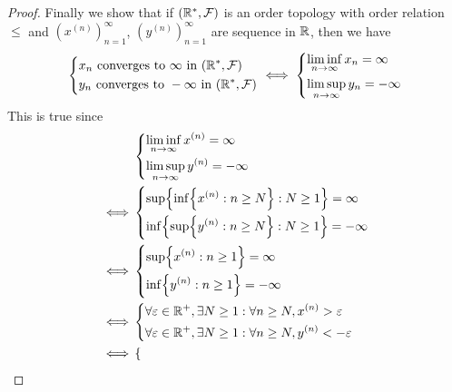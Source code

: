 \begin{proof}
  Finally we show that if  \((\mathbb{R}^*, \mathcal{F})\) is an order topology with order relation \(\leq\) and \((x^{(n)})_{n = 1}^\infty\), \((y^{(n)})_{n = 1}^\infty\) are sequence in \(\mathbb{R}\), then we have
  \[
    \begin{dcases}
      x_n \text{ converges to } \infty \text{ in } (\mathbb{R}^*, \mathcal{F})  \\
      y_n \text{ converges to } -\infty \text{ in } (\mathbb{R}^*, \mathcal{F}) \\
    \end{dcases} \iff \begin{dcases}
      \liminf_{n \to \infty} x_n = \infty \\
      \limsup_{n \to \infty} y_n = -\infty
    \end{dcases}
  \]
  This is true since
  \begin{align*}
         & \begin{dcases}
             \liminf_{n \to \infty} x^{(n)} = \infty \\
             \limsup_{n \to \infty} y^{(n)} = -\infty
           \end{dcases}                                                                                      \\
    \iff & \begin{dcases}
             \sup\set{\inf\set{x^{(n)} : n \geq N} : N \geq 1} = \infty \\
             \inf\set{\sup\set{y^{(n)} : n \geq N} : N \geq 1} = -\infty
           \end{dcases}                                                                    \\
    \iff & \begin{dcases}
             \sup\set{x^{(n)} : n \geq 1} = \infty \\
             \inf\set{y^{(n)} : n \geq 1} = -\infty
           \end{dcases}                                                                 \\
    \iff & \begin{dcases}
             \forall \varepsilon \in \R^+, \exists N \geq 1 : \forall n \geq N, x^{(n)} > \varepsilon \\
             \forall \varepsilon \in \R^+, \exists N \geq 1 : \forall n \geq N, y^{(n)} < -\varepsilon
           \end{dcases}                                     \\
    \iff & \begin{dcases}

\end{dcases}
\end{align*}
\end{proof}
